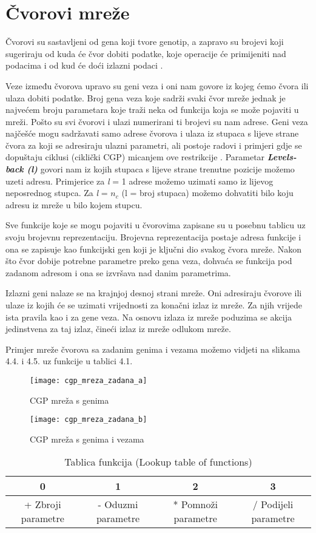 \section{Čvorovi mreže}
\par 
 \quad Čvorovi su sastavljeni od gena koji tvore genotip, a zapravo su brojevi koji sugeriraju od kuda će čvor dobiti podatke, koje operacije će primijeniti nad podacima i od kud će doći izlazni podaci \cite{CGPbook}. 
 \par Veze između čvorova upravo su geni veza i oni nam govore iz kojeg ćemo čvora ili ulaza dobiti podatke. Broj gena veza koje sadrži svaki čvor mreže jednak je najvećem broju parametara koje traži neka od funkcija koja se može pojaviti u mreži. Pošto su svi čvorovi i ulazi numerirani ti brojevi su nam adrese. Geni veza najčešće mogu sadržavati samo adrese čvorova i ulaza iz stupaca s lijeve strane čvora za koji se adresiraju ulazni parametri, ali postoje radovi i primjeri gdje se dopuštaju ciklusi (ciklički CGP) micanjem ove restrikcije \cite{CGPbook}. Parametar \textit{\textbf{Levels-back (l)}} govori nam iz kojih stupaca s lijeve strane trenutne pozicije možemo uzeti adresu. Primjerice za \textit{l} = 1 adrese možemo uzimati samo iz lijevog neposrednog stupca. Za \textit{l} = $ n_{c} $ (l = broj stupaca) možemo dohvatiti bilo koju adresu iz mreže u bilo kojem stupcu.
 \par 
Sve funkcije koje se mogu pojaviti u čvorovima zapisane su u posebnu tablicu uz svoju brojevnu reprezentaciju. Brojevna reprezentacija postaje adresa funkcije i ona se zapisuje kao funkcijski gen koji je ključni dio svakog čvora mreže. Nakon što čvor dobije potrebne parametre preko gena veza, dohvaća se funkcija pod zadanom adresom i ona se izvršava nad danim parametrima.
\par
Izlazni geni nalaze se na krajnjoj desnoj strani mreže. Oni adresiraju čvorove ili ulaze iz kojih će se uzimati vrijednosti za konačni izlaz iz mreže. Za njih vrijede ista pravila kao i za gene veza. Na osnovu izlaza iz mreže poduzima se akcija jedinstvena za taj izlaz, čineći izlaz iz mreže odlukom mreže.\par 
Primjer mreže čvorova sa zadanim genima i vezama možemo vidjeti na slikama 4.4. i 4.5. uz funkcije u tablici 4.1.
\begin{figure}[h]
	\centering
	\texttt{[image: cgp\_mreza\_zadana\_a]}
	\caption{CGP mreža s genima \cite{CGPpresentation}}
\end{figure}
\begin{figure}[h]
	\centering
	\texttt{[image: cgp\_mreza\_zadana\_b]}
	\caption{CGP mreža s genima i vezama \cite{CGPpresentation}}
\end{figure}
\begin{table}[h!]
\centering
\begin{tabular}{ |c|c|c|c|  }
	\hline
	0 & 1 & 2 & 3\\
	\hline
	+ Zbroji parametre  & - Oduzmi parametre &
	* Pomnoži parametre & / Podijeli parametre\\
	\hline
\end{tabular}
\caption{Tablica funkcija (Lookup table of functions)}
\end{table}
